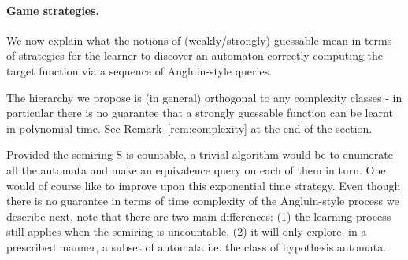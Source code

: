 \documentclass{lmcs}
\numberwithin{theorem}{section}
\begin{document}
\paragraph*{\textbf{Game strategies.}}

We now explain what the notions of (weakly/strongly) guessable mean in terms of strategies for the learner to discover an automaton correctly computing the target function via a sequence of Angluin-style queries.  

The hierarchy we propose is (in general) orthogonal to any complexity classes - in particular there is no guarantee that a strongly guessable function can be learnt in polynomial time. See Remark~\ref{rem:complexity} at the end of the section.

\begin{rem}
Provided the semiring S is countable, a trivial algorithm would be to enumerate all the automata and make an equivalence query on each of them in turn. One would of course like to improve upon this exponential time strategy. Even though there is no guarantee in terms of time complexity of the Angluin-style process we describe next, note that there are two main differences: (1) the learning process still applies when the semiring is uncountable, (2) it will only explore, in a prescribed manner, a subset of automata i.e. the class of hypothesis automata. 
\end{rem}
\end{document}
